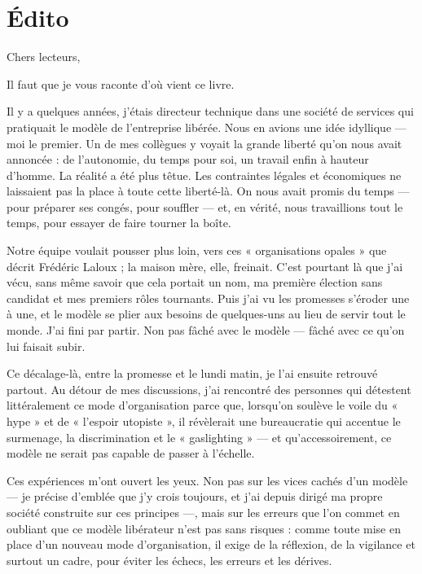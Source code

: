 
\part*{Édito}
Chers lecteurs,

Il faut que je vous raconte d'où vient ce livre.

Il y a quelques années, j'étais directeur technique dans une société de services qui pratiquait le modèle de l'entreprise libérée. Nous en avions une idée idyllique — moi le premier. Un de mes collègues y voyait la grande liberté qu'on nous avait annoncée : de l'autonomie, du temps pour soi, un travail enfin à hauteur d'homme. La réalité a été plus têtue. Les contraintes légales et économiques ne laissaient pas la place à toute cette liberté-là. On nous avait promis du temps — pour préparer ses congés, pour souffler — et, en vérité, nous travaillions tout le temps, pour essayer de faire tourner la boîte.

Notre équipe voulait pousser plus loin, vers ces « organisations opales » que décrit Frédéric Laloux ; la maison mère, elle, freinait. C'est pourtant là que j'ai vécu, sans même savoir que cela portait un nom, ma première élection sans candidat et mes premiers rôles tournants. Puis j'ai vu les promesses s'éroder une à une, et le modèle se plier aux besoins de quelques-uns au lieu de servir tout le monde. J'ai fini par partir. Non pas fâché avec le modèle — fâché avec ce qu'on lui faisait subir.

Ce décalage-là, entre la promesse et le lundi matin, je l'ai ensuite retrouvé partout. Au détour de mes discussions, j'ai rencontré des personnes qui détestent littéralement ce mode d'organisation parce que, lorsqu'on soulève le voile du « hype » et de « l'espoir utopiste », il révèlerait une bureaucratie qui accentue le surmenage, la discrimination et le « gaslighting » — et qu'accessoirement, ce modèle ne serait pas capable de passer à l'échelle.

Ces expériences m'ont ouvert les yeux. Non pas sur les vices cachés d'un modèle — je précise d'emblée que j'y crois toujours, et j'ai depuis dirigé ma propre société construite sur ces principes —, mais sur les erreurs que l'on commet en oubliant que ce modèle libérateur n'est pas sans risques : comme toute mise en place d'un nouveau mode d'organisation, il exige de la réflexion, de la vigilance et surtout un cadre, pour éviter les échecs, les erreurs et les dérives.

